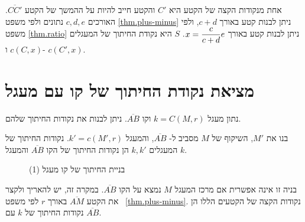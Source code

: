 אחת מנקודות הקצה של הקטע היא
$C'$
והקטע חייב להיות על ההמשך של הקטע
$\overline{CC'}$.
האורכים
$c,d,e$
נתונים ולפי משפט
\ref{thm.plus-minus}
ניתן לבנות קטע באורך
$c+d$,
ולפי משפט
\ref{thm.ratio}
ניתן לבנות קטע באורך
$x=\displaystyle\frac{c}{c+d}e$.
$S$
היא נקודת החיתוך של המעגלים
$c(C,x)$
ו-%
$c(C',x)$.

\section{מציאת נקודת החיתוך של קו עם מעגל}\label{s.line-circle}

\begin{theorem}
נתון מעגל
$k=C(M,r)$
וקו
$\overline{AB}$.
ניתן לבנות את נקודות החיתוך שלהם.
\end{theorem}



בנו את 
$M'$,
השיקוף של
$M$
מסביב ל-%
$\overline{AB}$,
והמעגל
$k'=c(M',r)$.
נקודות החיתוך של המעגלים
$k,k'$
הן נקודות החיתוך של הקו 
$\overline{AB}$
והמעגל
$k$.

\begin{figure}[htb]
\begin{center}
\end{center}
\caption{בניית החיתוך של קו מעגל (1)}\label{f.compass-circle4}
\end{figure}


בניה זו אינה אפשרית אם מרכז המעגל
$M$
נמצא על הקו
$\overline{AB}$.
במקרה זה, יש להאריך ולקצר את הקטע
$\overline{AM}$
באורך 
$r$
לפי משפט~%
\ref{thm.plus-minus}.
נקודות הקצה של הקטעים הללו הן נקודות החיתוך של
$k$
עם
$\overline{AB}$.

